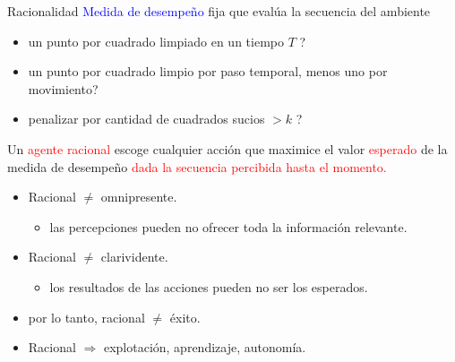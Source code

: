 \begin{frame}{Racionalidad}
\textcolor{blue}{Medida de desempeño} fija que evalúa la secuencia del ambiente
\begin{itemize}
  \item un punto por cuadrado limpiado en un tiempo $T$ ?
  \item un punto por cuadrado limpio por paso temporal, menos uno por movimiento?
   \item penalizar por cantidad de cuadrados sucios $>k$ ?
\end{itemize}
Un \textcolor{red}{agente racional} escoge cualquier acción que maximice el valor \textcolor{red}{esperado} de la medida de desempeño \textcolor{red}{dada la secuencia percibida hasta el momento.}

\begin{itemize}
   \item Racional $\neq$  omnipresente.
   \begin{itemize}
     \item las percepciones pueden no ofrecer toda la información relevante.
   \end{itemize}
    \item Racional $\neq$  clarividente.
   \begin{itemize}
     \item los resultados de las acciones pueden no ser los esperados.
   \end{itemize}
    \item por lo tanto, racional $\neq$ éxito.
     \item Racional $\Rightarrow$ explotación, aprendizaje, autonomía.
\end{itemize}
\end{frame}
